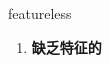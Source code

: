 
\begin{frame}
{\huge featureless}
\begin{center}
\begin{enumerate}\Large
  \item \textbf{缺乏特征的}
\end{enumerate}
\end{center}
\end{frame}
